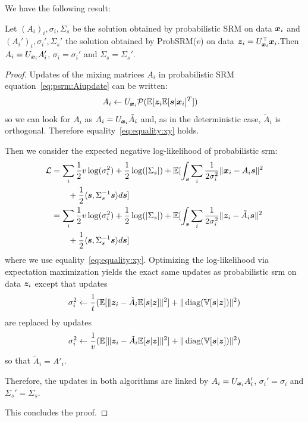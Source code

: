 We have the following result:
\begin{proposition}
  Let $(A_i)_i, \sigma_i, \Sigma_s$ be the solution obtained by probabilistic SRM on data
  $\boldsymbol{x}_i$ and $(A_i')_i, \sigma_i', \Sigma_s'$ the solution obtained by ProbSRM($v$) on
  data $\boldsymbol{z}_i = U_{\boldsymbol{x}_i}^{\top} \boldsymbol{x}_i$.Then $A_i = U_{\boldsymbol{x}_i}A_i'$, $\sigma_i =
  \sigma_i'$ and $\Sigma_s = \Sigma_s'$. 
  \label{prop:optimalprobsrm}
\end{proposition}
\begin{proof}
  Updates of the mixing matrices $A_i$ in probabilistic SRM
  equation~\eqref{eq:psrm:Aiupdate} can be written:
  \begin{align}
    A_i &\leftarrow U_{\boldsymbol{x}_i}\mathcal{P}(\mathbb{E}[\boldsymbol{z}_i \mathbb{E}[\boldsymbol{s}| \boldsymbol{x}_i]^T])
    \label{eq:fastprobsrm:Aiupdate}
  \end{align}
  so we can look for $A_i$ as $A_i = U_{\boldsymbol{x}_i} \tilde{A}_i$ and, as in the
  deterministic case, $\tilde{A}_i$ is orthogonal.
  Therefore equality~\eqref{eq:equality:xy} holds.
  
  Then we consider the expected negative log-likelihood of probabilistic srm:
  \begin{align}
    \mathcal{L} &= \sum_i \frac12 v\log(\sigma_i^2) + \frac12 \log(|\Sigma_s|) + \mathbb{E}[\int_{\boldsymbol{s}} \sum_i \frac1{2 \sigma_i^{2}} \|\boldsymbol{x}_i - A_i \boldsymbol{s} \|^2 \nonumber \\& \enspace \enspace \enspace \enspace+ \frac12 \langle{ \boldsymbol{s}},{ \Sigma_s^{-1} \boldsymbol{s} }\rangle  d\boldsymbol{s}] \\
          &= \sum_i \frac12 v \log(\sigma_i^2) + \frac12 \log(|\Sigma_s|) + \mathbb{E}[\int_{\boldsymbol{s}} \sum_i \frac1{2 \sigma_i^{2}}\|\boldsymbol{z}_i - \tilde{A}_i \boldsymbol{s} \|^2 \nonumber \\& \enspace \enspace \enspace \enspace+ \frac12 \langle{ \boldsymbol{s}},{ \Sigma_s^{-1} \boldsymbol{s} }\rangle  d\boldsymbol{s}]
  \end{align}
  where we use equality~\eqref{eq:equality:xy}.
  Optimizing the log-likelihood via expectation maximization yields the exact
  same updates as probabilistic srm on data $\boldsymbol{z}_i$
  except that updates
  \begin{align}
    \sigma_i^2 \leftarrow \frac1{t} (\mathbb{E}[\| \boldsymbol{z}_i - \tilde{A}_i \mathbb{E}[\boldsymbol{s}|\boldsymbol{z}]\|^2] + \| \operatorname*{diag}(\mathbb{V}[\boldsymbol{s} | \boldsymbol{z}]) \|^2)
  \end{align}
  are replaced by updates
  \begin{align}
    \sigma_i^2 \leftarrow \frac1{v} (\mathbb{E}[\| \boldsymbol{z}_i - \tilde{A}_i \mathbb{E}[\boldsymbol{s}|\boldsymbol{z}]\|^2] + \| \operatorname*{diag}(\mathbb{V}[\boldsymbol{s} | \boldsymbol{z}]) \|^2)
  \end{align}
  so that $\tilde{A}_i = A'_i$.

  Therefore, the updates in both algorithms are linked  by $A_i = U_{\boldsymbol{x}_i}A_i'$,
  $\sigma_i' =
  \sigma_i$ and $\Sigma_s'  = \Sigma_s$.

  This concludes the proof.
\end{proof}


